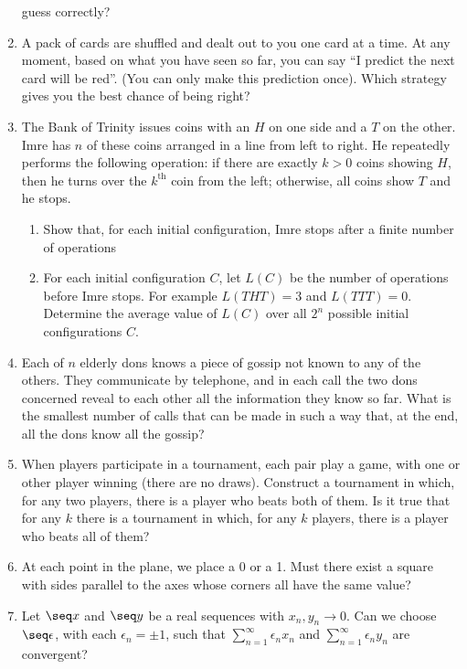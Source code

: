 \documentclass[12pt,a4paper]{article}
\begin{document}
\begin{enumerate}
  guess correctly?
 \item
  A pack of cards are shuffled and dealt out to you one card at a time. At any
  moment, based on what you have seen so far, you can say ``I predict the next
  card will be red''. (You can only make this prediction once). Which strategy
  gives you the best chance of being right?
 \item
  The Bank of Trinity issues coins with an \(H\) on one side and a \(T\) on the
  other. Imre has \(n\) of these coins arranged in a line from left to right. He
  repeatedly performs the following operation: if there are exactly \(k > 0\)
  coins showing \(H\), then he turns over the \(k^{\text{th}}\) coin from the
  left; otherwise, all coins show \(T\) and he stops.
  \begin{enumerate}
   \item
    Show that, for each initial configuration, Imre stops after a finite number
    of operations
   \item
    For each initial configuration \(C\), let \(L(C)\) be the number of
    operations before Imre stops. For example \(L(\mathit{THT}) = 3\) and
    \(L(\mathit{TTT}) = 0\). Determine the average value of \(L(C)\) over all
    \(2^n\) possible initial configurations \(C\).
  \end{enumerate}
 \item
  Each of \(n\) elderly dons knows a piece of gossip not known to any of the
  others. They communicate by telephone, and in each call the two dons
  concerned reveal to each other all the information they know so far. What is
  the smallest number of calls that can be made in such a way that, at the end,
  all the dons know all the gossip?
 \item
  When players participate in a tournament, each pair play a game, with one or
  other player winning (there are no draws). Construct a tournament in which,
  for any two players, there is a player who beats both of them. Is it true that
  for any \(k\) there is a tournament in which, for any \(k\) players, there is
  a player who beats all of them?
 \item
  At each point in the plane, we place a 0 or a 1. Must there exist a square
  with sides parallel to the axes whose corners all have the same value?
 \item
  Let \(\seq x\) and \(\seq y\) be a real sequences with \(x_n, y_n \to 0\). Can
  we choose \(\seq \epsilon\), with each \(\epsilon_n = \pm 1\), such that
  \(\sum_{n = 1}^\infty \epsilon_n x_n\) and
  \(\sum_{n = 1}^\infty \epsilon_n y_n\) are convergent?

\end{enumerate}
\end{document}
